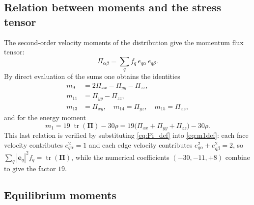 \documentclass[11pt,a4paper]{article}
\newcommand{\vect}[1]{\bm{#1}}
\newcommand{\tens}[1]{\bm{#1}}
\newcommand{\tr}{\operatorname{tr}}
\begin{document}
\subsection{Relation between moments and the stress tensor}

The second-order velocity moments of the distribution give the
momentum flux tensor:
\begin{equation}
  \Pi_{\alpha\beta} = \sum_q f_q\, e_{q\alpha}\, e_{q\beta} .
  \label{eq:Pi_def}
\end{equation}
By direct evaluation of the sums one obtains the identities
\begin{align}
  m_9  &= 2\Pi_{xx} - \Pi_{yy} - \Pi_{zz}, \label{eq:m9Pi}\\
  m_{11} &= \Pi_{yy} - \Pi_{zz}, \label{eq:m11Pi}\\
  m_{13} &= \Pi_{xy}, \quad m_{14} = \Pi_{yz}, \quad m_{15} = \Pi_{xz},
  \label{eq:m13Pi}
\end{align}
and for the energy moment
\begin{equation}
  m_1 = 19\;\tr(\tens{\Pi}) - 30\rho
      = 19\bigl(\Pi_{xx}+\Pi_{yy}+\Pi_{zz}\bigr) - 30\rho .
  \label{eq:m1Pi}
\end{equation}
This last relation is verified by substituting \eqref{eq:Pi_def} into
\eqref{eq:m1def}: each face velocity contributes $e_{q\alpha}^2=1$ and
each edge velocity contributes $e_{q\alpha}^2+e_{q\beta}^2=2$, so
$\sum_q |\vect{e}_q|^2 f_q = \tr(\tens{\Pi})$, while the numerical
coefficients $(-30,-11,+8)$ combine to give the factor $19$.

\subsection{Equilibrium moments}
\end{document}
